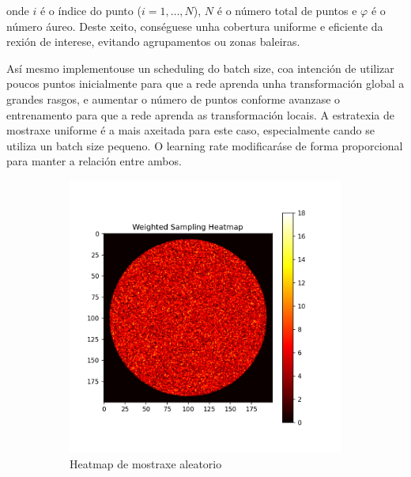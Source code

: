 onde $i$ é o índice do punto ($i = 1, \dots, N$), $N$ é o número total de puntos e $\varphi$ é o número áureo. 
Deste xeito, conséguese unha cobertura uniforme e eficiente da rexión de interese, evitando agrupamentos ou zonas baleiras.

Así mesmo implementouse un scheduling do batch size, coa intención de utilizar poucos puntos inicialmente para que a rede aprenda unha transformación global a grandes rasgos, e aumentar o número de puntos conforme avanzase o entrenamento para que a rede aprenda as transformación locais.
A estratexia de mostraxe uniforme é a mais axeitada para este caso, especialmente cando se utiliza un batch size pequeno.
O learning rate modificaráse de forma proporcional para manter a relación entre ambos.

\begin{figure}[]
    \centering
    \begin{subfigure}[b]{0.3\textwidth}
        \centering
        \includegraphics[width=\textwidth]{imaxes/random_sampling_heatmap.png}
        \caption{Heatmap de mostraxe aleatorio}
        \label{fig:random_sampling_heatmap}
    \end{subfigure}
    \hfill
    \begin{subfigure}[b]{0.3\textwidth}
        \centering

\end{subfigure}
\end{figure}
